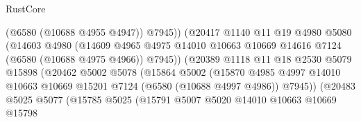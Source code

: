\begin{lexlean}{RustCore}
\begin{coremodule}
                                      (@6580 (@10688 @4955 @4947))
                                      @7945))
                                  (@20417
                                    @1140
                                    @11
                                    @19
                                    @4980
                                    @5080
                                    (@14603
                                      @4980
                                      (@14609
                                        @4965
                                        @4975
                                        @14010
                                        @10663
                                        @10669
                                        @14616
                                        @7124
                                        (@6580 (@10688 @4975 @4966))
                                        @7945))
                                    (@20389
                                      @1118
                                      @11
                                      @18
                                      @2530
                                      @5079
                                      @15898
                                      (@20462
                                        @5002
                                        @5078
                                        (@15864
                                          @5002
                                          (@15870
                                            @4985
                                            @4997
                                            @14010
                                            @10663
                                            @10669
                                            @15201
                                            @7124
                                            (@6580 (@10688 @4997 @4986))
                                            @7945))
                                        (@20483
                                          @5025
                                          @5077
                                          (@15785
                                            @5025
                                            (@15791
                                              @5007
                                              @5020
                                              @14010
                                              @10663
                                              @10669
                                              @15798

\end{coremodule}
\end{lexlean}
